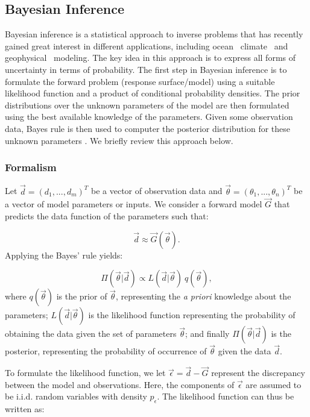 \subsection{Bayesian Inference}
 \label{sec:inference}
 
Bayesian inference is a statistical approach to inverse problems
that has recently gained great interest in different applications, including
ocean~\citep{Alexagnderian2011a,Zedler2012,sraj:2013a}
climate~\citep{OlsonEtAl2012} and geophysical~\citep{Malinverno2002} modeling.
The key idea in this approach is to express all forms of uncertainty
in terms of probability. The first step in Bayesian inference 
is to formulate the forward problem (response surface/model) using 
a suitable likelihood function and a product of conditional probability densities. 
The prior distributions over the unknown parameters of the model
are then formulated using the best available knowledge of the parameters.  Given some observation data, Bayes rule 
is then used to computer the posterior distribution for these unknown parameters
\citep{sivia}. We briefly review this approach below.
\subsubsection{Formalism}

Let $\vec{d}=(d_1,...,d_m)^T$ be a vector of observation data and $\vec{\theta}=(\theta_1,...,\theta_n)^T$ be a vector of model parameters or inputs. We consider a forward model $\vec G$ that predicts the data function of 
the parameters such that:

\begin{equation}
\vec d \approx \vec{G}( \vec \theta).
\end{equation}
Applying the Bayes' rule yields:

\begin{equation}
 \Pi(\vec{\theta}| \vec d) \propto 
 L(\vec d | \vec{\theta}) \ q(\vec{\theta}), 
\label{eq:bayes}
\end{equation}
where $q(\vec{\theta})$ is the prior of $\vec{\theta}$, representing the \emph{a priori} knowledge
about the parameters; 
$L(\vec d| \vec{\theta})$ is the likelihood function representing
the probability of obtaining the data given the set of parameters $\vec{\theta}$;
and finally $\Pi(\vec{\theta}| \vec d)$ is the posterior,
representing the probability of occurrence of $\vec{\theta}$ given the data $\vec d $.

To formulate the likelihood function, we let $\vec \epsilon = \vec d - \vec{G}$
represent the discrepancy between the model and observations.
Here, the components of $\vec \epsilon $ are assumed to be i.i.d. random variables with density $p_{\epsilon}$.
The likelihood function can thus be written as:

